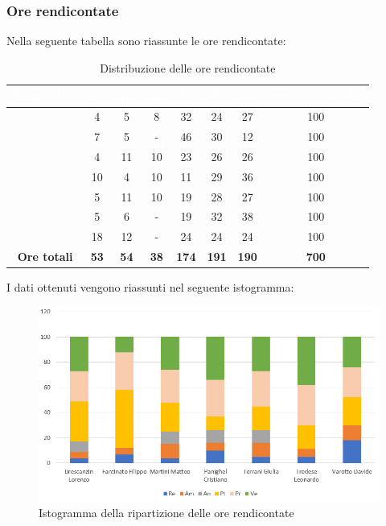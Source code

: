 \subsubsection{Ore rendicontate}
Nella seguente tabella sono riassunte le ore rendicontate:
\begin{table}[H]
	\begin{center}
		\begin{tabular}{ |c c c c c c c c| }
		\rowcolor{darkblue} 
		\textcolor{white}{\textbf{Nominativo}} & \textcolor{white}{\textbf{Re}} & \textcolor{white}{\textbf{Am}} & \textcolor{white}{\textbf{An}} & \textcolor{white}{\textbf{Pt}} & \textcolor{white}{\textbf{Pr}} & \textcolor{white}{\textbf{Ve}} & \textcolor{white}{\textbf{Ore Complessive}} \\ \hline
		\BL 	& 4  	& 5  	& 8 	& 32 	& 24 	& 27 	& 100 \\ \hline
		\FF 	& 7 	& 5 	& -		& 46 	& 30 	& 12 	& 100 \\ \hline
		\MM 	& 4  	& 11  	& 10 	& 23 	& 26 	& 26  	& 100 \\ \hline
		\PC 	& 10 	& 4  	& 10	& 11 	& 29	& 36 	& 100 \\ \hline
		\TG 	& 5  	& 11 	& 10 	& 19 	& 28 	& 27 	& 100 \\ \hline
		\TL 	& 5  	& 6 	& - 	& 19 	& 32 	& 38 	& 100 \\ \hline
		\VD 	& 18  	& 12  	& -		& 24 	& 24 	& 24 	& 100 \\ \hline
		\textbf{Ore totali} & \textbf{53} & \textbf{54} & \textbf{38} & \textbf{174} & \textbf{191} & \textbf{190} & \textbf{700} \\ \hline
		\end{tabular}
	\caption{Distribuzione delle ore rendicontate}
	\end{center}
\end{table}
I dati ottenuti vengono riassunti nel seguente istogramma:
\begin{figure}[H]
    \centering
    \includegraphics[scale = 0.70]{Immagini/TotaleRendicontatoIsto.png}
    \caption{Istogramma della ripartizione delle ore rendicontate}
    \label{fig:Istogramma ripartizione ore totali rendicontate}
\end{figure}
